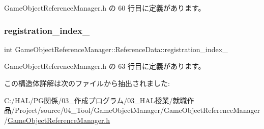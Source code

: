  Game\+Object\+Reference\+Manager.\+h の 60 行目に定義があります。

\mbox{\label{struct_game_object_reference_manager_1_1_reference_data_a36154b84fbcaa168786a74854cfda609}} 
\subsubsection{\texorpdfstring{registration\+\_\+index\+\_\+}{registration\_index\_}}
{\footnotesize\ttfamily int Game\+Object\+Reference\+Manager\+::\+Reference\+Data\+::registration\+\_\+index\+\_\+}



 Game\+Object\+Reference\+Manager.\+h の 63 行目に定義があります。



この構造体詳解は次のファイルから抽出されました\+:\begin{DoxyCompactItemize}
\item 
C\+:/\+H\+A\+L/\+P\+G関係/03\+\_\+作成プログラム/03\+\_\+\+H\+A\+L授業/就職作品/\+Project/source/04\+\_\+\+Tool/\+Game\+Object\+Manager/\+Game\+Object\+Reference\+Manager/\mbox{\hyperlink{_game_object_reference_manager_8h}{Game\+Object\+Reference\+Manager.\+h}}\end{DoxyCompactItemize}
